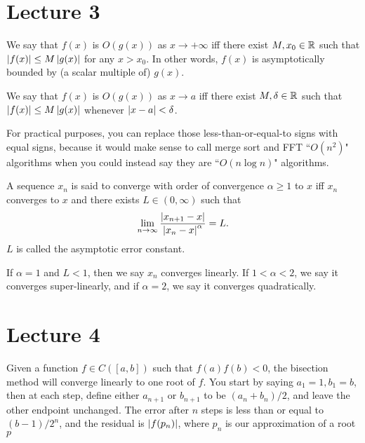 \documentclass{article}
\begin{document}
\section{Lecture 3}
We say that $f(x)$ is $O(g(x))$ as $x \rightarrow +\infty$ iff there exist $M, x_0 \in \mathbb{R}$ such that $\left\lvert f(x) \right\rvert \leq M \left\lvert g(x) \right\rvert$ for any $x > x_0$. In other words, $f(x)$ is asymptotically bounded by (a scalar multiple of) $g(x)$.
\par
We say that $f(x)$ is $O(g(x))$ as $x \rightarrow a$ iff there exist $M, \delta \in \mathbb{R}$ such that $\left\lvert f(x) \right\rvert \leq M \left\lvert g(x) \right\rvert$ whenever $\left\lvert x-a \right\rvert<\delta$.
\par
For practical purposes, you can replace those less-than-or-equal-to signs with equal signs, because it would make sense to call merge sort and FFT ``$O(n^2)$" algorithms when you could instead say they are ``$O(n \log n)$" algorithms.
\par
A sequence $x_n$ is said to converge with order of convergence $\alpha \geq 1$ to $x$ iff $x_n$ converges to $x$ and there exists $L \in (0, \infty)$ such that
\[ \lim_{n \rightarrow \infty} \frac{\left\lvert x_{n+1}-x \right\rvert}{\left\lvert x_n-x \right\rvert^\alpha} = L.\]
$L$ is called the asymptotic error constant.
\par
If $\alpha=1$ and $L<1$, then we say $x_n$ converges linearly. If $1 < \alpha < 2$, we say it converges super-linearly, and if $\alpha=2$, we say it converges quadratically.

\section{Lecture 4}
Given a function $f \in C([a,b])$ such that $f(a)f(b)<0$, the bisection method will converge linearly to one root of $f$. You start by saying $a_1=1, b_1=b$, then at each step, define either $a_{n+1}$ or $b_{n+1}$ to be $(a_n+b_n)/2$, and leave the other endpoint unchanged. The error after $n$ steps is less than or equal to $(b-1)/2^n$, and the residual is $\left\lvert f(p_n) \right\rvert$, where $p_n$ is our approximation of a root $p$
\end{document}
